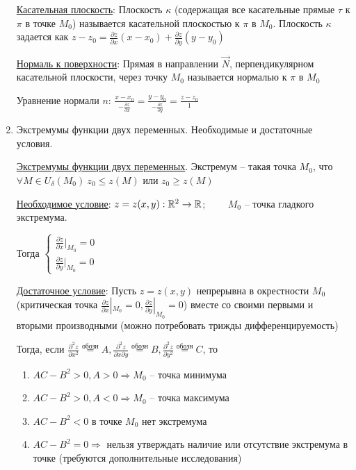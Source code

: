 \documentclass[12pt]{article}
\begin{document}
\begin{enumerate}
        \hyperlink{tangentplanetosurface}{Касательная плоскость}: Плоскость $\kappa$ (содержащая все касательные прямые $\tau$ к $\pi$ в точке $M_0$) называется касательной плоскостью к $\pi$ в $M_0$. Плоскость $\kappa$ задается как $z - z_0 = \frac{\partial z}{\partial x}(x - x_0) + \frac{\partial z}{\partial y} (y - y_0)$

        \hyperlink{normaltosurface}{Нормаль к поверхности}: Прямая в направлении $\overrightarrow{N}$, перпендикулярном касательной плоскости, через точку $M_0$ называется нормалью к $\pi$ в $M_0$

        Уравнение нормали $n$: $\frac{x - x_0}{-\frac{\partial z}{\partial x}} = \frac{y - y_0}{-\frac{\partial z}{\partial y}} = \frac{z - z_0}{1}$


        \item Экстремумы функции двух переменных. Необходимые и достаточные условия.

        \hyperlink{extremumsoffunctions}{Экстремумы функции двух переменных}.
        Экстремум -- такая точка $M_0$, что $\forall M \in U_\delta(M_0) \ z_0 \leq z(M)$ или $z_0 \geq z(M)$

        \hyperlink{extremumnecessarycondition}{Необходимое условие}: $z = z(x, y) : \mathbb{R}^2 \rightarrow \mathbb{R}$; $\quad\quad M_0$ -- точка гладкого экстремума.

        Тогда $\begin{cases}\frac{\partial z}{\partial x} |_{M_0} = 0 \\ \frac{\partial z}{\partial y} |_{M_0} = 0\end{cases}$

        \hyperlink{extremumsufficientcondition}{Достаточное условие}: Пусть $z = z(x, y)$ непрерывна в окрестности $M_0$ (критическая точка $\frac{\partial z}{\partial x} |_{M_0} = 0, \frac{\partial z}{\partial y} |_{M_0} = 0$)
        вместе со своими первыми и вторыми производными (можно потребовать трижды дифференцируемость)

        Тогда, если $\frac{\partial^2 z}{\partial x^2} \stackrel{\text{обозн}}{=} A, \frac{\partial^2 z}{\partial x \partial y} \stackrel{\text{обозн}}{=} B, \frac{\partial^2 z}{\partial y^2} \stackrel{\text{обозн}}{=} C$, то

        \begin{enumerate}
            \item $AC - B^2 > 0, A > 0 \Longrightarrow M_0$ -- точка минимума
            \item $AC - B^2 > 0, A < 0 \Longrightarrow M_0$ -- точка максимума
            \item $AC - B^2 < 0$ в точке $M_0$ нет экстремума
            \item $AC - B^2 = 0\Longrightarrow$ нельзя утверждать наличие или отсутствие экстремума в точке (требуются дополнительные исследования)
        \end{enumerate}

    \end{enumerate}
\end{document}
